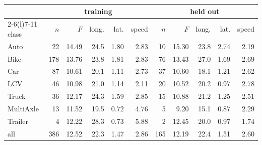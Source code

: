 \begin{tabular}{@{}l rrrrr rrrrr@{}}\toprule
 & \multicolumn{5}{c}{training} & \multicolumn{5}{c}{held out}\\
\cmidrule(lr){2-6}\cmidrule(l){7-11}
class & $n$ & $F$ & long. & lat. & speed & $n$ & $F$ & long. & lat. & speed\\\midrule
Auto & 22 & 14.49 & 24.5 & 1.80 & 2.83 & 10 & 15.30 & 23.8 & 2.74 & 2.19\\
Bike & 178 & 13.76 & 23.8 & 1.81 & 2.83 & 76 & 13.43 & 27.0 & 1.69 & 2.69\\
Car & 87 & 10.61 & 20.1 & 1.11 & 2.73 & 37 & 10.60 & 18.1 & 1.21 & 2.62\\
LCV & 46 & 10.98 & 21.0 & 1.14 & 2.11 & 20 & 10.52 & 20.2 & 0.97 & 2.78\\
Truck & 36 & 12.17 & 24.3 & 1.59 & 2.85 & 15 & 10.88 & 21.2 & 1.25 & 2.51\\
MultiAxle & 13 & 11.52 & 19.5 & 0.72 & 4.76 & 5 & 9.20 & 15.1 & 0.87 & 2.29\\
Trailer & 4 & 12.22 & 28.3 & 0.73 & 5.88 & 2 & 12.45 & 20.0 & 0.97 & 1.74\\
\midrule all & 386 & 12.52 & 22.3 & 1.47 & 2.86 & 165 & 12.19 & 22.4 & 1.51 & 2.60\\
\bottomrule\end{tabular}

